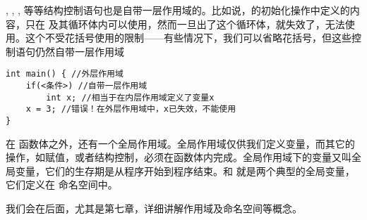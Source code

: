 \lstinline@if@, \lstinline@else@, \lstinline@for@, \lstinline@while@ 等等结构控制语句也是自带一层作用域的。比如说，\lstinline@for@ 的初始化操作中定义的内容，只在 \lstinline@for@ 及其循环体内可以使用，然而一旦出了这个循环体，\lstinline@i@ 就失效了，无法使用。这个不受花括号使用的限制——有些情况下，我们可以省略花括号，但这些控制语句仍然自带一层作用域
\begin{lstlisting}
int main() { //外层作用域
    if(<条件>) //自带一层作用域
        int x; //相当于在内层作用域定义了变量x
    x = 3; //错误！在外层作用域中，x已失效，不能使用
}
\end{lstlisting}\par
在 \lstinline@main@ 函数体之外，还有一个全局作用域。全局作用域仅供我们定义变量，而其它的操作，如赋值，或者结构控制，必须在函数体内完成。全局作用域下的变量又叫全局变量，它们的生存期是从程序开始到程序结束。\lstinline@cin@ 和 \lstinline@cout@ 就是两个典型的全局变量，它们定义在 \lstinline@std@ 命名空间中。\par
我们会在后面，尤其是第七章，详细讲解作用域及命名空间等概念。\par
